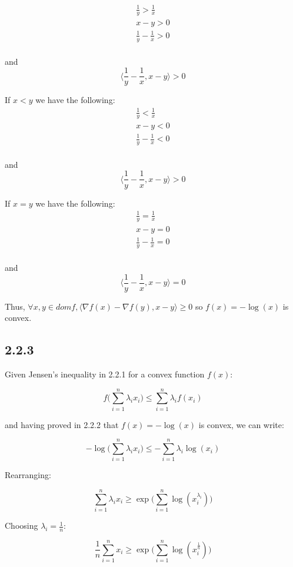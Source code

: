 \documentclass[12pt]{article}
\begin{document}
\begin{gather*}
    \frac{1}{y} > \frac{1}{x}\\
    x-y>0\\
    \frac{1}{y} - \frac{1}{x} > 0\\
\end{gather*}

and
\[\langle \frac{1}{y}-\frac{1}{x}, x-y \rangle > 0\]

If $x<y$ we have the following:
\begin{gather*}
    \frac{1}{y} < \frac{1}{x}\\
    x-y<0\\
    \frac{1}{y} - \frac{1}{x} < 0\\
\end{gather*}

and
\[\langle \frac{1}{y}-\frac{1}{x}, x-y \rangle > 0\]

If $x=y$ we have the following:
\begin{gather*}
    \frac{1}{y} = \frac{1}{x}\\
    x-y=0\\
    \frac{1}{y} - \frac{1}{x} = 0\\
\end{gather*}

and
\[\langle \frac{1}{y}-\frac{1}{x}, x-y \rangle = 0\]

Thus, $\forall x, y \in dom f, \langle \nabla f(x) - \nabla f(y), x-y \rangle \geq 0$ so $f(x) = -\log(x)$ is convex. \square

\subsection*{2.2.3}

Given Jensen's inequality in 2.2.1 for a convex function $f(x)$:

\[f\bigg(\sum_{i=1}^n \lambda_i x_i\bigg) \leq \sum_{i=1}^n \lambda_i f(x_i)\]

and having proved in 2.2.2 that $f(x) = -\log(x)$ is convex, we can write:

\[-\log\bigg(\sum_{i=1}^n \lambda_i x_i\bigg) \leq - \sum_{i=1}^n \lambda_i \log(x_i)\]

Rearranging:

\[\sum_{i=1}^n \lambda_i x_i \geq \exp \bigg(\sum_{i=1}^n \log(x_i^{\lambda_i}) \bigg)\]


Choosing $\lambda_i = \frac{1}{n}$:

\[\frac{1}{n}\sum_{i=1}^n x_i \geq \exp \bigg(\sum_{i=1}^n \log(x_i^{\frac{1}{n}}) \bigg)\]
\end{document}
